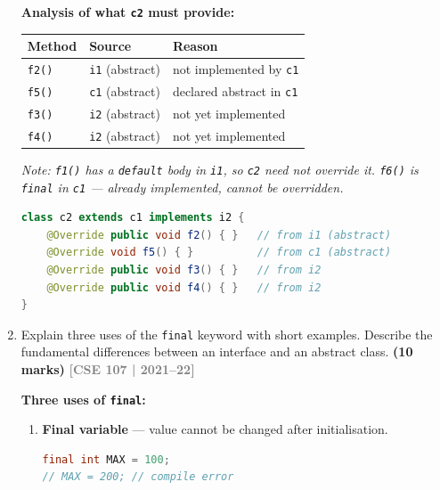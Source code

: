 \documentclass[12pt,a3paper]{article}
\newcommand{\yr}[1]{\hfill\textcolor{gray}{\small\textbf{[#1]}}}
\newcommand{\mk}[1]{\textcolor{orange!70!black}{\small\textbf{(#1 marks)}}}
\begin{document}
\begin{enumerate}
\begin{tcolorbox}[enhanced,breakable,ansbox,
  colback=cD!4,colframe=cD,boxrule=0.8pt,arc=5pt,
  title={\textbf{Answer --- Minimum Code for \texttt{c2}}},
  fonttitle=\bfseries\color{white},colbacktitle=cD]
\textbf{Analysis of what \texttt{c2} must provide:}

\begin{center}
\small
\begin{tabular}{@{}lll@{}}
\toprule
\textbf{Method} & \textbf{Source} & \textbf{Reason} \\
\midrule
\texttt{f2()} & \texttt{i1} (abstract) & not implemented by \texttt{c1} \\
\texttt{f5()} & \texttt{c1} (abstract) & declared abstract in \texttt{c1} \\
\texttt{f3()} & \texttt{i2} (abstract) & not yet implemented \\
\texttt{f4()} & \texttt{i2} (abstract) & not yet implemented \\
\bottomrule
\end{tabular}
\end{center}

\textit{Note: \texttt{f1()} has a \texttt{default} body in \texttt{i1},
so \texttt{c2} need not override it. \texttt{f6()} is \texttt{final}
in \texttt{c1} --- already implemented, cannot be overridden.}

\begin{lstlisting}[language=Java]
class c2 extends c1 implements i2 {
    @Override public void f2() { }   // from i1 (abstract)
    @Override void f5() { }          // from c1 (abstract)
    @Override public void f3() { }   // from i2
    @Override public void f4() { }   // from i2
}
\end{lstlisting}

\end{tcolorbox}

\item Explain three uses of the \texttt{final} keyword with short examples. Describe the fundamental differences between an interface and an abstract class. \mk{10}
\yr{CSE 107 | 2021--22}

\begin{tcolorbox}[enhanced,breakable,ansbox,
  colback=cD!4,colframe=cD,boxrule=0.8pt,arc=5pt,
  title={\textbf{Answer --- \texttt{final} Keyword (3 Uses) \& Interface vs.\ Abstract Class}},
  fonttitle=\bfseries\color{white},colbacktitle=cD]

\textbf{Three uses of \texttt{final}:}

\begin{enumerate}[label=\textbf{\arabic*.}]
  \item \textbf{Final variable} --- value cannot be changed after initialisation.
\begin{lstlisting}[language=Java]
final int MAX = 100;
// MAX = 200; // compile error
\end{lstlisting}


\end{enumerate}
\end{tcolorbox}
\end{enumerate}
\end{document}

